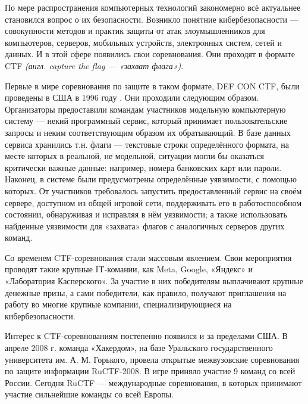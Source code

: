 По мере распространения компьютерных технологий закономерно всё актуальнее становился вопрос о их безопасности. Возникло понятние кибербезопасности --- совокупности методов и практик защиты от атак злоумышленников для компьютеров, серверов, мобильных устройств, электронных систем, сетей и данных. И в этой сфере появились свои соревнования. Они проходят в формате CTF \textit{(англ. capture the flag --- «захват флага»)}.



Первые в мире соревнования по защите в таком формате, DEF CON CTF, были проведены в США в 1996 году \cite{Defcon}. Они проходили следующим образом. Организаторы предоставили командам участников модельную компьютерную систему --- некий программный сервис, который принимает пользовательские запросы и неким соответствующим образом их обратывающий. В базе данных сервиса хранились т.н. флаги --- текстовые строки определённого формата, на месте которых в реальной, не модельной, ситуации могли бы оказаться критически важные данные: например, номера банковских карт или пароли. Наконец, в системе были предусмотрены определённые уявзимости, с помощью которых. От участников требовалось запустить предоставленный сервис на своём сервере, доступном из общей игровой сети, поддерживать его в работоспособном состоянии, обнаруживая и исправляя в нём уязвимости; а также использовать найденные уязвимости для «захвата» флагов с аналогичных серверов других команд.

Со временем CTF-соревнования стали массовым явлением. Свои мероприятия проводят такие крупные IT-комании, как Meta\cite{FBCTF}, Google\cite{GoogleCTF}, «Яндекс»\cite{YaCTF} и «Лаборатория Касперского»\cite{KasperskyCTF}. За участие в них победителям выплачивают крупные денежные призы, а сами победители, как правило, получают приглашения на работу во многие крупные компании, специализирующиеся на кибербезопасности.

Интерес к CTF-соревнованиям постепенно появился и за пределами США. В апреле 2008 г. команда «Хакердом», на базе Уральского государственного университета им. А. М. Горького, провела открытые межвузовские соревнования по защите информации RuCTF-2008. В игре приняло участие 9 команд со всей России\cite{Hackerdom08}. Сегодня RuCTF --- международные соревнования, в которых принимают участие сильнейшие команды со всей Европы\cite{Hackerdom20}.

